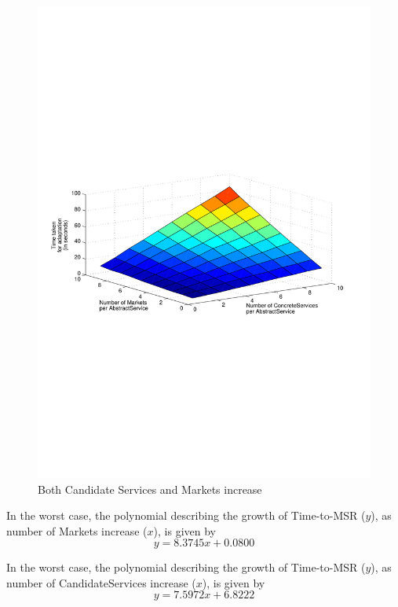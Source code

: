\documentclass[10pt,journal,compsoc]{IEEEtran}
\begin{document}
\begin{figure}[htbp]%
	\centering
	\includegraphics[clip, trim=2cm 10cm 1cm 10cm, scale=0.5]{graphs/scaling_time_svcs_mkts.pdf}
	\caption{Both Candidate Services and Markets increase \label{fig:svc_and_mkts_scaling}}%
\end{figure}

In the worst case, the polynomial describing the growth of Time-to-MSR ($y$), as number of Markets increase ($x$), is given  by
\begin{equation}
    y =  8.3745x  +  0.0800 \label{eq:mkt_vs_cand}
\end{equation}

In the worst case, the polynomial describing the growth of Time-to-MSR ($y$), as number of CandidateServices increase ($x$), is given  by
\begin{equation}
    y =   7.5972x  +  6.8222 \label{eq:cand_vs_mkt}
\end{equation}
\end{document}
